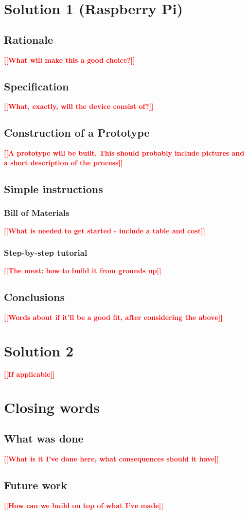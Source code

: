 \documentclass[thesis=B,english,hidelinks]{template/FITthesisXE}
\newcommand{\todo}[1]{\textcolor{red}{\textbf{[[#1]]}}}
\newcommand{\blind}[1][1]{\textcolor{gray}{\Blindtext[#1][1]}}
\begin{document}
\chapter{Solution 1 (Raspberry Pi)}
    \section{Rationale}
        \todo{What will make this a good choice?}
        \blind[2]
    \section{Specification}
        \todo{What, exactly, will the device consist of?}
        \blind[3]
    \section{Construction of a Prototype}
        \todo{A prototype will be built.  This should probably include pictures and a short description of the process}
        \blind[3]
    \section{Simple instructions}
        \subsection{Bill of Materials}
            \todo{What is needed to get started - include a table and cost}
            \blind[3]
        \subsection{Step-by-step tutorial}
            \todo{The meat: how to build it from grounds up}
            \blind[4]
    \section{Conclusions}
        \todo{Words about if it'll be a good fit, after considering the above}
        \blind[2]
\chapter{Solution 2}
    \todo{If applicable}
\chapter{Closing words}
    \section{What was done}
        \todo{What is it I've done here, what consequences should it have}
        \blind[2]
    \section{Future work}
        \todo{How can we build on top of what I've made}
        \blind[2]

    
\end{document}
